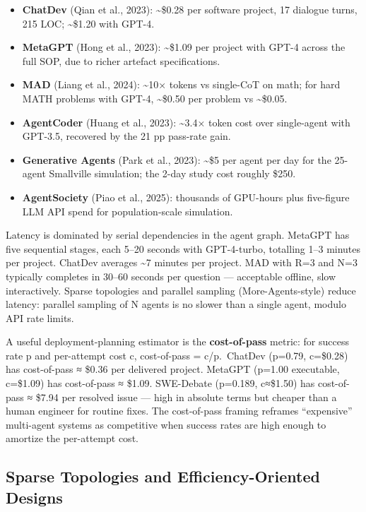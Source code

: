 \begin{itemize}
\tightlist
\item
  \textbf{ChatDev} (Qian et al., 2023): \textasciitilde\$0.28 per software project, 17 dialogue turns, 215 LOC; \textasciitilde\$1.20 with GPT-4.
\item
  \textbf{MetaGPT} (Hong et al., 2023): \textasciitilde\$1.09 per project with GPT-4 across the full SOP, due to richer artefact specifications.
\item
  \textbf{MAD} (Liang et al., 2024): \textasciitilde10× tokens vs single-CoT on math; for hard MATH problems with GPT-4, \textasciitilde\$0.50 per problem vs \textasciitilde\$0.05.
\item
  \textbf{AgentCoder} (Huang et al., 2023): \textasciitilde3.4× token cost over single-agent with GPT-3.5, recovered by the 21 pp pass-rate gain.
\item
  \textbf{Generative Agents} (Park et al., 2023): \textasciitilde\$5 per agent per day for the 25-agent Smallville simulation; the 2-day study cost roughly \$250.
\item
  \textbf{AgentSociety} (Piao et al., 2025): thousands of GPU-hours plus five-figure LLM API spend for population-scale simulation.
\end{itemize}

Latency is dominated by serial dependencies in the agent graph. MetaGPT has five sequential stages, each 5--20 seconds with GPT-4-turbo, totalling 1--3 minutes per project. ChatDev averages \textasciitilde7 minutes per project. MAD with R=3 and N=3 typically completes in 30--60 seconds per question --- acceptable offline, slow interactively. Sparse topologies and parallel sampling (More-Agents-style) reduce latency: parallel sampling of N agents is no slower than a single agent, modulo API rate limits.

A useful deployment-planning estimator is the \textbf{cost-of-pass} metric: for success rate p and per-attempt cost c, cost-of-pass = c/p.~ChatDev (p=0.79, c=\$0.28) has cost-of-pass ≈ \$0.36 per delivered project. MetaGPT (p=1.00 executable, c=\$1.09) has cost-of-pass ≈ \$1.09. SWE-Debate (p=0.189, c≈\$1.50) has cost-of-pass ≈ \$7.94 per resolved issue --- high in absolute terms but cheaper than a human engineer for routine fixes. The cost-of-pass framing reframes ``expensive'' multi-agent systems as competitive when success rates are high enough to amortize the per-attempt cost.

\subsection{Sparse Topologies and Efficiency-Oriented Designs}\label{sparse-topologies-and-efficiency-oriented-designs}

